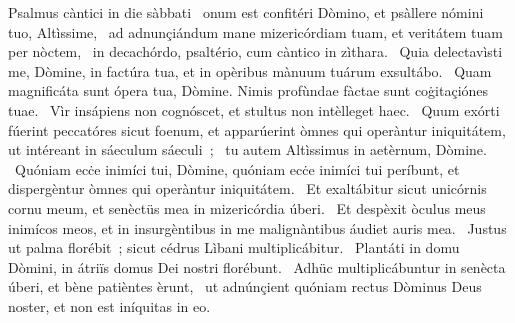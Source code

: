 { Psalmus càntici in die sàbbati}
{%
~onum est confitéri Dòmino, et psàllere nómini tuo, Altìssime, 
~ad adnunçiándum mane mizericórdiam tuam, et veritátem tuam per nòctem, 
~in decachórdo, psaltério, cum càntico in zìthara. 
~Quia delectavìsti me, Dòmine, in factúra tua, et in opèribus mànuum tuárum exsultábo. 
~Quam magnificáta sunt ópera tua, Dòmine. Nimis profùndae fàctae sunt coġitaçiónes tuae. 
~Vìr insápiens non cognóscet, et stultus non intèlleget haec. 
~Quum exórti fúerint peccatóres sicut foenum, et apparúerint òmnes qui operàntur iniquitátem, ut intéreant in sáeculum sáeculi~; 
~tu autem Altìssimus in aetèrnum, Dòmine. 
~Quóniam ecċe inimíci tui, Dòmine, quóniam ecċe inimíci tui períbunt, et dispergèntur òmnes qui operàntur iniquitátem. 
~Et exaltábitur sicut unicórnis cornu meum, et senèctüs mea in mizericórdia úberi. 
~Et despèxit òculus meus inimícos meos, et in insurgèntibus in me malignàntibus áudiet auris mea. 
~Justus ut palma florébit~; sicut cédrus Lìbani multiplicábitur. 
~Plantáti in domu Dòmini, in átriïs domus Dei nostri florébunt. 
~Adhüc multiplicábuntur in senècta úberi, et bène patièntes èrunt, 
~ut adnúnçient quóniam rectus Dòminus Deus noster, et non est iníquitas in eo. 
}
